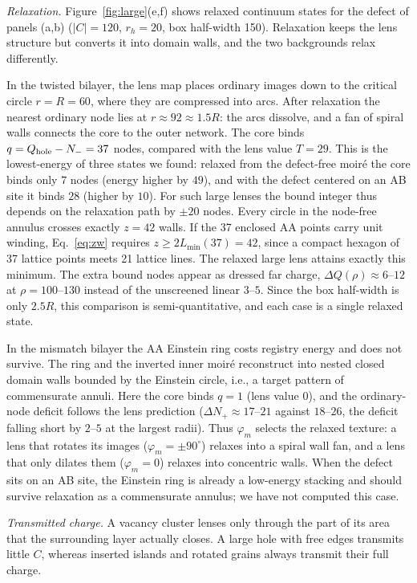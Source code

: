 \documentclass[prb,twocolumn,superscriptaddress,floatfix,10pt]{revtex4-2}
\begin{document}
\emph{Relaxation.} Figure~\ref{fig:large}(e,f) shows relaxed continuum states for the defect of panels (a,b) ($|C|=120$, $r_h=20$, box half-width 150). Relaxation keeps the lens structure but converts it into domain walls, and the two backgrounds relax differently.

In the twisted bilayer, the lens map places ordinary images down to the critical circle $r=R=60$, where they are compressed into arcs. After relaxation the nearest ordinary node lies at $r\approx92\approx1.5R$: the arcs dissolve, and a fan of spiral walls connects the core to the outer network. The core binds $q=Q_{\rm hole}-N_-=37$ nodes, compared with the lens value $T=29$. This is the lowest-energy of three states we found: relaxed from the defect-free moir\'e the core binds only $7$ nodes (energy higher by $49$), and with the defect centered on an AB site it binds $28$ (higher by $10$). For such large lenses the bound integer thus depends on the relaxation path by $\pm20$ nodes. Every circle in the node-free annulus crosses exactly $z=42$ walls. If the 37 enclosed AA points carry unit winding, Eq.~\eqref{eq:zw} requires $z\ge2L_{\min}(37)=42$, since a compact hexagon of 37 lattice points meets 21 lattice lines. The relaxed large lens attains exactly this minimum. The extra bound nodes appear as dressed far charge, $\Delta Q(\rho)\approx6$--$12$ at $\rho=100$--$130$ instead of the unscreened linear $3$--$5$. Since the box half-width is only $2.5R$, this comparison is semi-quantitative, and each case is a single relaxed state.

In the mismatch bilayer the AA Einstein ring costs registry energy and does not survive. The ring and the inverted inner moir\'e reconstruct into nested closed domain walls bounded by the Einstein circle, i.e., a target pattern of commensurate annuli. Here the core binds $q=1$ (lens value $0$), and the ordinary-node deficit follows the lens prediction ($\Delta N_+\approx17$--$21$ against $18$--$26$, the deficit falling short by $2$--$5$ at the largest radii). Thus $\varphi_m$ selects the relaxed texture: a lens that rotates its images ($\varphi_m=\pm90^\circ$) relaxes into a spiral wall fan, and a lens that only dilates them ($\varphi_m=0$) relaxes into concentric walls. When the defect sits on an AB site, the Einstein ring is already a low-energy stacking and should survive relaxation as a commensurate annulus; we have not computed this case.

\emph{Transmitted charge.} A vacancy cluster lenses only through the part of its area that the surrounding layer actually closes. A large hole with free edges transmits little $C$, whereas inserted islands and rotated grains always transmit their full charge.
\end{document}
